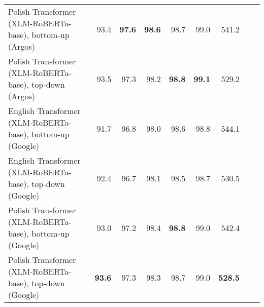 \begin{table}[ht!]
{\begin{tabular}{lrrrrrrrr}
  Polish Transformer (XLM-RoBERTa-base), bottom-up (Argos) & 93.4 & \textbf{97.6} & \textbf{98.6} & 98.7 & 99.0 & 541.2 \\ 
  Polish Transformer (XLM-RoBERTa-base), top-down (Argos) & 93.5 & 97.3 & 98.2 & \textbf{98.8} & \textbf{99.1} & 529.2 \\ 
  English Transformer (XLM-RoBERTa-base), bottom-up (Google) & 91.7 & 96.8 & 98.0 & 98.6 & 98.8 & 544.1 \\ 
  English Transformer (XLM-RoBERTa-base), top-down (Google) & 92.4 & 96.7 & 98.1 & 98.5 & 98.7 & 530.5 \\ 
  Polish Transformer (XLM-RoBERTa-base), bottom-up (Google) & 93.0 & 97.2 & 98.4 & \textbf{98.8} & 99.0 & 542.4 \\ 
  Polish Transformer (XLM-RoBERTa-base), top-down (Google) & \textbf{93.6} & 97.3 & 98.3 & 98.7 & 99.0 & \textbf{528.5} \\ 
   \hline
\end{tabular}
}
\end{table}




